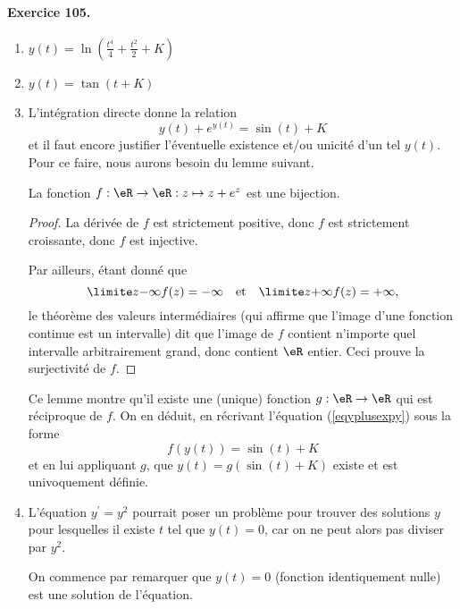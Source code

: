 \paragraph{Exercice 105.}
\begin{enumerate}
\item $y(t) = \ln(\frac{t^4}{4} + \frac{t^2}{2} + K)$
\item $y(t) = \tan(t + K)$
\item L'intégration directe donne la relation
\begin{equation}\label{eqyplusexpy}
y(t) + e^{y(t)} = \sin(t) + K
\end{equation}
et il faut encore justifier l'éventuelle existence et/ou unicité
d'un tel $y(t)$. Pour ce faire, nous aurons besoin du lemme suivant.

\begin{lemma}
La fonction $f : \eR \to \eR : z \mapsto z + e^z$ est une
bijection.
\end{lemma}
\begin{proof}
La dérivée de $f$ est strictement positive, donc $f$ est strictement
croissante, donc $f$ est injective.

Par ailleurs, étant donné que
\begin{equation*}
\limite z {-\infty} f(z) = -\infty \quad\text{et}\quad \limite z
{+\infty} f(z) = +\infty,
\end{equation*}
le théorème des valeurs intermédiaires (qui affirme que l'image
d'une fonction continue est un intervalle) dit que l'image de $f$
contient n'importe quel intervalle arbitrairement grand, donc
contient $\eR$ entier. Ceci prouve la surjectivité de $f$.
\end{proof}

Ce lemme montre qu'il existe une (unique) fonction $g : \eR \to \eR$
qui est réciproque de $f$. On en déduit, en récrivant l'équation
(\ref{eqyplusexpy}) sous la forme
\begin{equation*}
f(y(t)) = \sin(t) + K
\end{equation*}
et en lui appliquant $g$, que $y(t) = g(\sin(t) + K)$ existe et est
univoquement définie.

\item L'équation $y^\prime = y^2$ pourrait poser un problème pour
trouver des solutions $y$ pour lesquelles il existe $t$ tel que
$y(t) = 0$, car on ne peut alors pas diviser par $y^2$.

On commence par remarquer que $y(t) = 0$ (fonction identiquement
nulle) est une solution de l'équation.


\end{enumerate}
